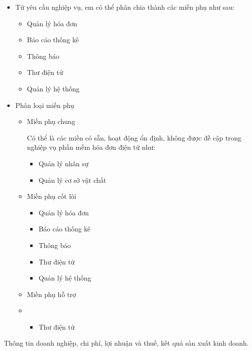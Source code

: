 \begin{itemize}

\item Từ yêu cầu nghiệp vụ, em có thể phân chia thành các miền phụ như sau:


\begin{itemize}


\item Quản lý hóa đơn

\item Báo cáo thống kê

\item Thông báo

\item Thư điện tử

\item Quản lý hệ thống

\end{itemize}
\item Phân loại miền phụ





\begin{itemize}



\item Miền phụ chung

Có thể là các miền có sẵn, hoạt động ổn định, không được đề cập trong nghiệp vụ phần mềm hóa đơn điện tử như:

\begin{itemize}

\item Quản lý nhân sự
\item Quản lý cơ sở vật chất

\end{itemize}



\item Miền phụ cốt lõi
\begin{itemize}


\item Quản lý hóa đơn


\item Báo cáo thống kê

\item Thông báo

\item Thư điện tử

\item Quản lý hệ thống

\end{itemize}
\item Miền phụ hỗ trợ
\item \begin{itemize}

\item Thư điện tử

\end{itemize}
\end{itemize}
\end{itemize}
Thông tin doanh nghiệp, chi phí, lợi nhuận và thuế, kết quả sản xuất kinh doanh.
